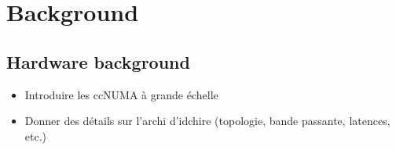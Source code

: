 \documentclass{Styles/llncs}
\newcommand{\benchs}{KASTORS }
\begin{document}



\section{Background}
\subsection{Hardware background}
\begin{itemize}
  \item Introduire les ccNUMA à grande échelle
  \item Donner des détails sur l'archi d'idchire (topologie, bande
    passante, latences, etc.)
\end{itemize}
\end{document}
